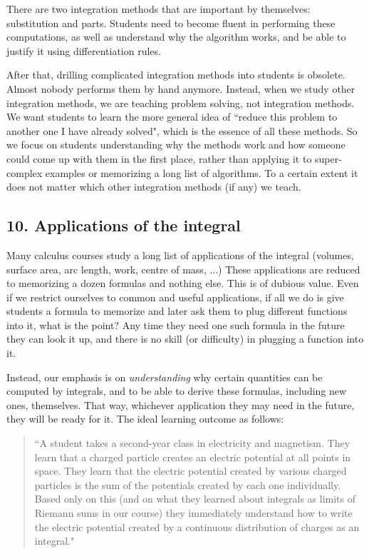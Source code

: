 \documentclass[11pt]{article}
\begin{document}
	There are two integration methods that are important by themselves: substitution
	and parts. Students need to become fluent in performing these computations, as
	well as understand why the algorithm works, and be able to justify it using
	differentiation rules.

	{\baselineskip

	After that, drilling complicated integration methods into students is obsolete. Almost nobody performs them by hand anymore. Instead, when we study other integration methods, we are teaching problem solving, not integration methods. We want students to learn the more general idea of ``reduce this problem to another one I have already solved", which is the essence of all these methods. So we focus on students understanding why the methods work and how someone could come up with them in the first place, rather than applying it to super-complex examples or memorizing a long list of algorithms. To a certain extent it does not matter which other integration methods (if any) we teach. }

	\subsection{10. Applications of the integral}

	Many calculus courses study a long list of applications of the integral (volumes,
	surface area, arc length, work, centre of mass, ...) These applications are reduced
	to memorizing a dozen formulas and nothing else. This is of dubious value. Even
	if we restrict ourselves to common and useful applications, if all we do is
	give students a formula to memorize and later ask them to plug different
	functions into it, what is the point? Any time they need one such formula in
	the future they can look it up, and there is no skill (or difficulty) in plugging
	a function into it.


	Instead, our emphasis is on \emph{understanding} why certain quantities can be computed by integrals, and to be able to derive these formulas, including new ones, themselves. That way, whichever application they may need in the future, they will be ready for it. The ideal learning outcome as follows: 

	\begin{quotation}
		``A student takes a second-year class in electricity and magnetism. They
		learn that a charged particle creates an electric potential at all points in
		space. They learn that the electric potential created by various charged particles
		is the sum of the potentials created by each one individually. Based only on
		this (and on what they learned about integrals as limits of Riemann sums in our
		course) they immediately understand how to write the electric potential
		created by a continuous distribution of charges as an integral."
	\end{quotation}
\end{document}
